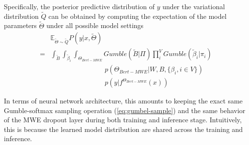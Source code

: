 Specifically, the posterior predictive distribution of $y$ under the variational distribution $\tilde{Q}$ can be obtained by computing the expectation of the model parameters $\tilde{\Theta}$ under all possible model settings
\begin{align}
& \mathbb{E}_{\tilde{\Theta} \sim \tilde{Q}} P (y | x, \tilde{\Theta}) \nonumber\\ 
= & \int_{\tilde{B}} \int_{\tilde{\beta}_i}\int_{\Theta_{Bert-MWE}} Gumble(\tilde{B} | \Pi) \prod_i^{V} Gumble(\tilde{\beta}_i | \pi_i) \nonumber\\ 
& \quad \quad \quad \quad \quad \quad \quad \quad p(\Theta_{Bert-MWE} \vert W, B, \{\beta_i, i \in V\}) \nonumber\\ 
& \quad \quad \quad \quad \quad \quad \quad \quad p(y \vert f^{\Theta_{Bert-MWE}}(x)) 
\label{eq:exp-gumble}
\end{align}

In terms of neural network architecture, this amounts to keeping the exact same Gumble-softmax sampling operation (\autoref{eq:gumbel-sample}) and the same behavior of the MWE dropout layer during both training and inference stage. Intuitively, this is because the learned model distribution are shared across the training and inference.